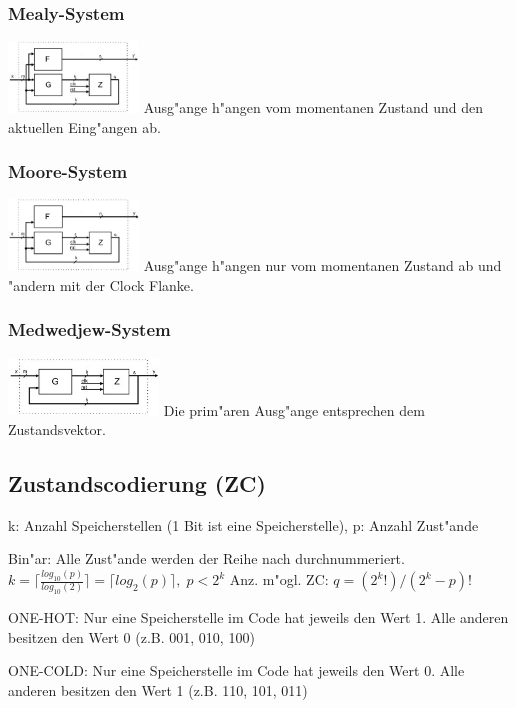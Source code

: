 	\begin{multicols}{3}
		\subsubsection{Mealy-System}
			\includegraphics[width=0.26\textwidth]{pics/seq_mealy}
			Ausg"ange h"angen vom momentanen Zustand und den aktuellen Eing"angen ab.
			\columnbreak
			
		\subsubsection{Moore-System}
			\includegraphics[width=0.26\textwidth]{pics/seq_moore}
			Ausg"ange h"angen nur vom momentanen Zustand ab und "andern mit der Clock Flanke.
			\columnbreak
			
		\subsubsection{Medwedjew-System}
			\includegraphics[width=0.3\textwidth]{pics/seq_medmedjew}
			Die prim"aren Ausg"ange entsprechen dem Zustandsvektor.
			\columnbreak
	\end{multicols}
	
\subsection{Zustandscodierung (ZC)}
	k: Anzahl Speicherstellen (1 Bit ist eine Speicherstelle), p: Anzahl Zust"ande
	\begin{multicols}{3}
		\begin{compactitem}
			\item Bin"ar: Alle Zust"ande werden der Reihe nach durchnummeriert. \\
			$k = \lceil \frac{log_{10}(p)}{log_{10}(2)} \rceil = \lceil log_2(p)\rceil, \; p < 2^k $
			Anz. m"ogl. ZC: $q = (2^k!)/(2^k - p)!$
			\item ONE-HOT: Nur eine Speicherstelle im Code hat jeweils den Wert 1. Alle anderen besitzen den Wert 0 (z.B. 001, 010, 100)
			\item ONE-COLD: Nur eine Speicherstelle im Code hat jeweils den Wert 0. Alle anderen besitzen den Wert 1 (z.B. 110, 101, 011)
		\end{compactitem}
	\end{multicols}


